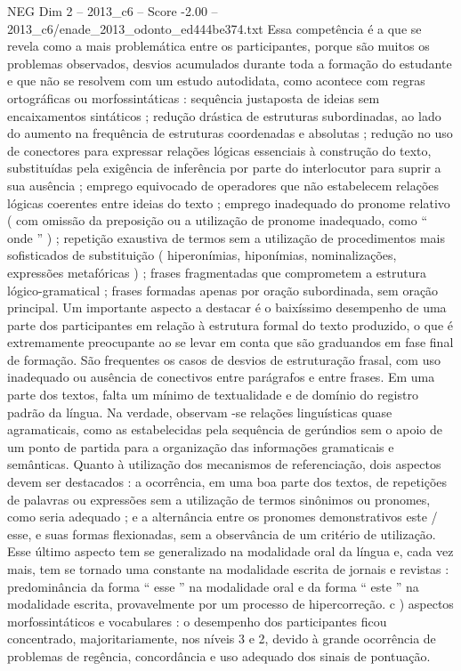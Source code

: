 \begin{textsample}{NEG Dim 2 – 2013\_c6 – Score -2.00 – 2013\_c6/enade\_2013\_odonto\_ed444be374.txt}
Essa competência é a que se revela como a mais problemática entre os participantes, porque são muitos os problemas observados, desvios acumulados durante toda a formação do estudante e que não se resolvem com um estudo autodidata, como acontece com regras ortográficas ou morfossintáticas : sequência justaposta de ideias sem encaixamentos sintáticos ; redução drástica de estruturas subordinadas, ao lado do aumento na frequência de estruturas coordenadas e absolutas ; redução no uso de conectores para expressar relações lógicas essenciais à construção do texto, substituídas pela exigência de inferência por parte do interlocutor para suprir a sua ausência ; emprego equivocado de operadores que não estabelecem relações lógicas coerentes entre ideias do texto ; emprego inadequado do pronome relativo ( com omissão da preposição ou a utilização de pronome inadequado, como “ onde ” ) ; repetição exaustiva de termos sem a utilização de procedimentos mais sofisticados de substituição ( hiperonímias, hiponímias, nominalizações, expressões metafóricas ) ; frases fragmentadas que comprometem a estrutura lógico-gramatical ; frases formadas apenas por oração subordinada, sem oração principal.
Um importante aspecto a destacar é o baixíssimo desempenho de uma parte dos participantes em relação à estrutura formal do texto produzido, o que é extremamente preocupante ao se levar em conta que são graduandos em fase final de formação.
São frequentes os casos de desvios de estruturação frasal, com uso inadequado ou ausência de conectivos entre parágrafos e entre frases.
Em uma parte dos textos, falta um mínimo de textualidade e de domínio do registro padrão da língua.
Na verdade, observam -se relações linguísticas quase agramaticais, como as estabelecidas pela sequência de gerúndios sem o apoio de um ponto de partida para a organização das informações gramaticais e semânticas.
Quanto à utilização dos mecanismos de referenciação, dois aspectos devem ser destacados : a ocorrência, em uma boa parte dos textos, de repetições de palavras ou expressões sem a utilização de termos sinônimos ou pronomes, como seria adequado ; e a alternância entre os pronomes demonstrativos este / esse, e suas formas flexionadas, sem a observância de um critério de utilização.
Esse último aspecto tem se generalizado na modalidade oral da língua e, cada vez mais, tem se tornado uma constante na modalidade escrita de jornais e revistas : predominância da forma “ esse ” na modalidade oral e da forma “ este ” na modalidade escrita, provavelmente por um processo de hipercorreção. c ) aspectos morfossintáticos e vocabulares : o desempenho dos participantes ficou concentrado, majoritariamente, nos níveis 3 e 2, devido à grande ocorrência de problemas de regência, concordância e uso adequado dos sinais de pontuação.

\end{textsample}

